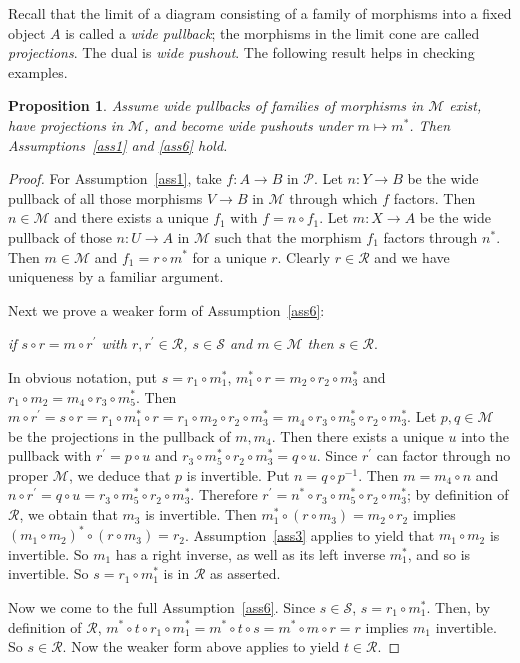 \documentclass[a4paper,12pt,reqno]{amsart}
\newtheorem{proposition}[theorem]{Proposition}
\theoremstyle{definition}
\theoremstyle{fact}
\theoremstyle{genquest}
\theoremstyle{step}
\newcommand{\dd}{\colon}
\newcommand{\ra}{\rightarrow}
\def\CM{{\mathscr M}}
\def\CP{{\mathscr P}}
\def\CR{{\mathscr R}}
\def\CS{{\mathscr S}}
\begin{document}
Recall that the limit of a diagram consisting of a family of morphisms into
a fixed object $A$ is called a {\em wide pullback}; the morphisms in the
limit cone are called {\em projections}. 
The dual is {\em wide pushout}.  
The following result helps in checking examples.

\begin{proposition}\label{factorize}
Assume wide pullbacks of families of morphisms in $\CM$ exist, 
have projections in $\CM$, and become wide pushouts under $m \mapsto m^*$.
Then Assumptions~\ref{ass1} and \ref{ass6} hold.
\end{proposition}
\begin{proof}
For Assumption~\ref{ass1}, take $f \dd A \ra B$ in $\CP$.
Let $n\dd Y\ra B$ be the wide pullback of all those morphisms 
$V\ra B$ in $\CM$ through which $f$ factors.
Then $n\in \CM$ and there exists a unique $f_1$ with $f = n\circ f_1$.
Let $m\dd X\ra A$ be the wide pullback of those $n\dd U\ra A$ in $\CM$ 
such that the morphism $f_1$ factors through $n^*$.
Then $m\in \CM$ and $f_1 = r \circ m^*$ for a unique $r$.
Clearly $r\in \CR$ and we have uniqueness by a familiar argument. 

Next we prove a weaker form of Assumption~\ref{ass6}: 

{\em if $s\circ r = m\circ r^{\prime}$ with $r,r^{\prime} \in \CR$, $s\in \CS$ and $m\in \CM$ then $s\in \CR$}.

\noindent In obvious notation, put $s=r_1\circ m_1^*$, $m_1^*\circ r = m_2\circ r_2\circ m_3^*$
and $r_1\circ m_2=m_4\circ r_3\circ m_5^*$.
Then $m\circ r^{\prime} = s\circ r = r_1\circ m_1^*\circ r = r_1\circ m_2\circ r_2 \circ m_3^* = m_4\circ r_3\circ m_5^*\circ r_2 \circ m_3^*$. 
Let $p,q\in \CM$ be the projections in the pullback of $m,m_4$. 
Then there exists a unique $u$ into the pullback with $r^{\prime} = p\circ u$
and $r_3\circ m_5^*\circ r_2 \circ m_3^* = q\circ u$. 
Since $r^{\prime}$ can factor through no proper $\CM$, we deduce that $p$ is invertible.
Put $n = q\circ p^{-1}$.
Then $m=m_4\circ n$ and $n\circ r^{\prime} = q\circ u = r_3\circ m_5^*\circ r_2 \circ m_3^*$. Therefore $r^{\prime} = n^* \circ r_3\circ m_5^*\circ r_2 \circ m_3^*$;
by definition of $\CR$, we obtain that $m_3$ is invertible. 
Then $m_1^*\circ (r\circ m_3) = m_2 \circ r_2$ implies 
$(m_1\circ m_2)^*\circ (r\circ m_3) = r_2$. Assumption~\ref{ass3} applies to yield that
$m_1\circ m_2$ is invertible. So $m_1$ has a right inverse, as well as its left inverse
$m_1^*$, and so is invertible. So $s=r_1\circ m_1^*$ is in $\CR$ as asserted.  

Now we come to the full Assumption~\ref{ass6}. 
Since $s\in \CS$, $s= r_1\circ m_1^*$. 
Then, by definition of $\CR$, $m^*\circ t \circ r_1\circ m_1^* 
= m^*\circ t \circ s= m^*\circ m\circ r = r$ implies $m_1$
invertible. So $s\in \CR$. Now the weaker form above applies to yield $t\in \CR$.  
\end{proof}
\end{document}
